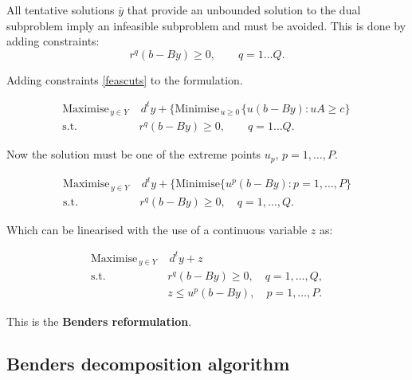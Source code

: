 All tentative solutions $\overline{y}$ that provide an unbounded  solution to the dual subproblem  imply an infeasible  subproblem and must be avoided.  This is done by  adding  constraints:
\begin{equation}
\label{feascuts}
r^q(b-By) \geq 0, \qquad q=1 \dots Q.
\end{equation}


Adding  constraints \eqref{feascuts} to the  formulation.
\vspace{-0.5cm}

\begin{align*}
\textrm{Maximise}_{\, y \in Y \,}  & \, d^ty + \{ \textrm{Minimise}_{\, u\geq 0 \,} \{ u(b-By)
: uA \geq c\}\, \\
\textrm{s.t.} \quad & r^q(b-By) \geq 0, \qquad q=1 \dots Q.
\end{align*}

Now the solution must be one of the extreme points $u_p, \, p=1,\hdots,P. $
\vspace{-0.5cm}

\begin{align*}
\textrm{Maximise}_{\, y \in Y \,}  & \,  d^ty + \{ \textrm{Minimise}\{u^p(b-By): p=1,\hdots,P \} \\
\textrm{s.t.} \quad & r^q(b-By) \geq 0, \quad  q=1,\hdots,Q.
\end{align*}

Which can be linearised with the use of a continuous variable $z$ as:
\vspace{-0.5cm}

\begin{align*}
\textrm{Maximise}_{\, y \in Y \,}  & \,  d^ty + z \\
\textrm{s.t.} \quad & r^q(b-By) \geq 0, \quad  q=1,\hdots,Q,\\
& z \leq u^p(b-By), \quad  p=1,\hdots,P.
\end{align*}



This is the \textbf{Benders reformulation}. 


\newpage

\subsection*{Benders decomposition algorithm}

